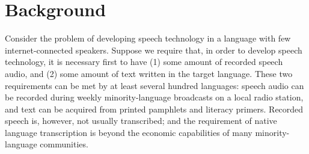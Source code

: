 \section{Background}

Consider the problem of developing speech technology in a language
with few internet-connected speakers.  Suppose we require that, in
order to develop speech technology, it is necessary first to have (1)
some amount of recorded speech audio, and (2) some amount of text
written in the target language.  These two requirements can be met by
at least several hundred languages: speech audio can be recorded
during weekly minority-language broadcasts on a local radio station,
and text can be acquired from printed pamphlets and literacy primers.
Recorded speech is, however, not usually transcribed; and the
requirement of native language transcription is beyond the economic
capabilities of many minority-language communities.
